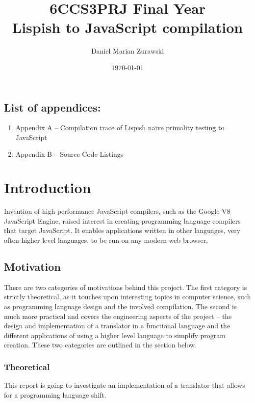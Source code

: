 \documentclass[11pt]{informatics-report}
\title{6CCS3PRJ Final Year\\\vspace{0.2cm}Lispish to JavaScript compilation}
\author{Daniel Marian Zurawski}
\date{\today}
\begin{document}
\createFrontMatter
\onehalfspacing
\tableofcontents
\doublespacing


\section*{List of appendices:}
\begin{enumerate}

\item Appendix A -- Compilation trace of Lispish naive primality testing to JavaScript
\item Appendix B -- Source Code Listings
\end{enumerate}
\listoffigures


\chapter{Introduction}
Invention of high performance JavaScript compilers, such as the Google V8 JavaScript Engine, raised interest in creating programming language 
compilers that target JavaScript. It enables applications written in other languages, very often higher level languages, to be run on any modern web browser.
 
 \section{Motivation}
There are two categories of motivations behind this project. The first category is strictly theoretical, as it touches upon interesting topics in computer science, such as programming language design and the involved compilation. The second is much more practical and covers the engineering aspects of the project -- the design and implementation of a translator in a functional language and the different applications of using a higher level language to simplify program creation.  
These two categories are outlined in the section below.

\subsection{Theoretical}
This report is going to investigate an implementation of a translator that allows for a programming language shift.
\end{document}
